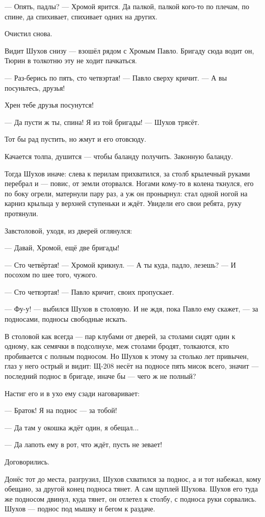 --- Опять, падлы? --- Хромой ярится. Да палкой, палкой кого-то по плечам, по спине, да спихивает,
спихивает одних на других.

Очистил снова.

Видит Шухов снизу --- взошёл рядом с Хромым Павло. Бригаду сюда водит он, Тюрин в толкотню эту
не ходит пачкаться.

--- Раз-берись по пять, сто четвэртая! --- Павло сверху кричит. --- А вы посуньтесь, друзья!

Хрен тебе друзья посунутся!

--- Да пусти ж ты, спина! Я из той бригады! --- Шухов трясёт.

Тот бы рад пустить, но жмут и его отовсюду.

Качается толпа, душится --- чтобы баланду получить. Законную баланду.

Тогда Шухов иначе: слева к перилам прихватился, за столб крылечный руками перебрал и ---
повис, от земли оторвался. Ногами кому-то в колена ткнулся, его по боку огрели, матернули пару
раз, а уж он пронырнул: стал одной ногой на карниз крыльца у верхней ступеньки и ждёт. Увидели
его свои ребята, руку протянули.

Завстоловой, уходя, из дверей оглянулся:

--- Давай, Хромой, ещё две бригады!

--- Сто четвёртая! --- Хромой крикнул. --- А ты куда, падло, лезешь? --- И посохом по шее того, чужого.

--- Сто четвэртая! --- Павло кричит, своих пропускает.

--- Фу-у! --- выбился Шухов в столовую. И не ждя, пока Павло ему скажет, --- за подносами, подносы
свободные искать.

В столовой как всегда --- пар клубами от дверей, за столами сидят один к одному, как семячки в
подсолнухе, меж столами бродят, толкаются, кто пробивается с полным подносом. Но Шухов к
этому за столько лет привычен, глаз у него острый и видит: Щ-208 несёт на подносе пять мисок
всего, значит --- последний поднос в бригаде, иначе бы --- чего ж не полный?

Настиг его и в ухо ему сзади наговаривает:

--- Браток! Я на поднос --- за тобой!

--- Да там у окошка ждёт один, я обещал...

--- Да лапоть ему в рот, что ждёт, пусть не зевает!

Договорились.

Донёс тот до места, разгрузил, Шухов схватился за поднос, а и тот набежал, кому обещано, за
другой конец подноса тянет. А сам щуплей Шухова. Шухов его туда же подносом двинул, куда
тянет, он отлетел к столбу, с подноса руки сорвались. Шухов --- поднос под мышку и бегом к
раздаче.


